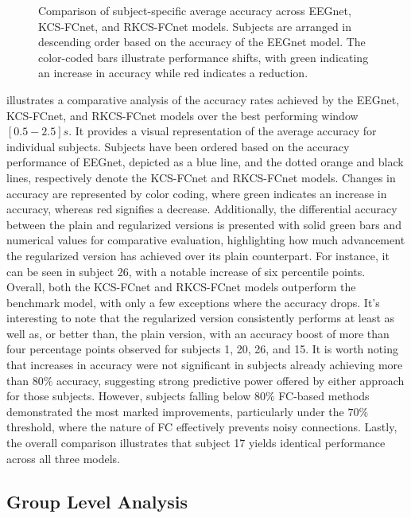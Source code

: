 \begin{figure}[h!]
  \centering
  \resizebox{\linewidth}{!}{}
  \caption{Comparison of subject-specific average accuracy across EEGnet, KCS-FCnet, and RKCS-FCnet models. Subjects are arranged in descending order based on the accuracy of the EEGnet model. The color-coded bars illustrate performance shifts, with green indicating an increase in accuracy while red indicates a reduction.}\label{fig:accuracy_sbj_comp}
\end{figure}



 illustrates a comparative analysis of the accuracy rates achieved by the EEGnet, KCS-FCnet, and RKCS-FCnet models over the best performing window $[0.5-2.5]s$. It provides a visual representation of the average accuracy for individual subjects. Subjects have been ordered based on the accuracy performance of EEGnet, depicted as a blue line, and the dotted orange and black lines, respectively denote the KCS-FCnet and RKCS-FCnet models. Changes in accuracy are represented by color coding, where green indicates an increase in accuracy, whereas red signifies a decrease. Additionally, the differential accuracy between the plain and regularized versions is presented with solid green bars and numerical values for comparative evaluation, highlighting how much advancement the regularized version has achieved over its plain counterpart. For instance, it can be seen in subject 26, with a notable increase of six percentile points. Overall, both the KCS-FCnet and RKCS-FCnet models outperform the benchmark model, with only a few exceptions where the accuracy drops. It's interesting to note that the regularized version consistently performs at least as well as, or better than, the plain version, with an accuracy boost of more than four percentage points observed for subjects 1, 20, 26, and 15. It is worth noting that increases in accuracy were not significant in subjects already achieving more than $80\%$ accuracy, suggesting strong predictive power offered by either approach for those subjects. However, subjects falling below $80\%$ FC-based methods demonstrated the most marked improvements, particularly under the $70\%$ threshold, where the nature of FC effectively prevents noisy connections. Lastly, the overall comparison illustrates that subject 17 yields identical performance across all three models.

\subsection{Group Level Analysis}

